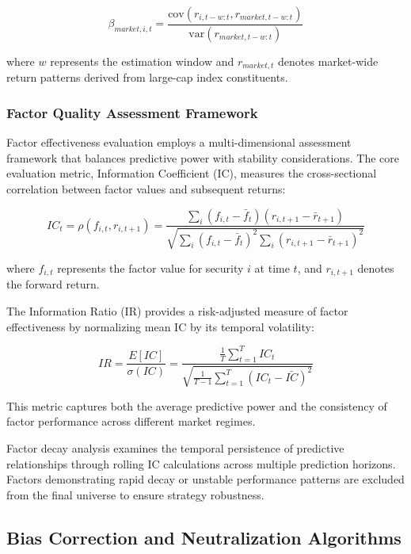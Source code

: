 \documentclass[conference]{IEEEtran}
\begin{document}
\begin{equation}
\beta_{market,i,t} = \frac{\text{cov}(r_{i,t-w:t}, r_{market,t-w:t})}{\text{var}(r_{market,t-w:t})}
\end{equation}

where $w$ represents the estimation window and $r_{market,t}$ denotes market-wide return patterns derived from large-cap index constituents.

\subsubsection{Factor Quality Assessment Framework}

Factor effectiveness evaluation employs a multi-dimensional assessment framework that balances predictive power with stability considerations. The core evaluation metric, Information Coefficient (IC), measures the cross-sectional correlation between factor values and subsequent returns:

\begin{equation}
IC_t = \rho\left(f_{i,t}, r_{i,t+1}\right) = \frac{\sum_i (f_{i,t} - \bar{f}_t)(r_{i,t+1} - \bar{r}_{t+1})}{\sqrt{\sum_i (f_{i,t} - \bar{f}_t)^2 \sum_i (r_{i,t+1} - \bar{r}_{t+1})^2}}
\end{equation}

where $f_{i,t}$ represents the factor value for security $i$ at time $t$, and $r_{i,t+1}$ denotes the forward return.

The Information Ratio (IR) provides a risk-adjusted measure of factor effectiveness by normalizing mean IC by its temporal volatility:

\begin{equation}
IR = \frac{E[IC]}{\sigma(IC)} = \frac{\frac{1}{T}\sum_{t=1}^T IC_t}{\sqrt{\frac{1}{T-1}\sum_{t=1}^T (IC_t - \bar{IC})^2}}
\end{equation}

This metric captures both the average predictive power and the consistency of factor performance across different market regimes.

Factor decay analysis examines the temporal persistence of predictive relationships through rolling IC calculations across multiple prediction horizons. Factors demonstrating rapid decay or unstable performance patterns are excluded from the final universe to ensure strategy robustness.

\subsection{Bias Correction and Neutralization Algorithms}
\end{document}

